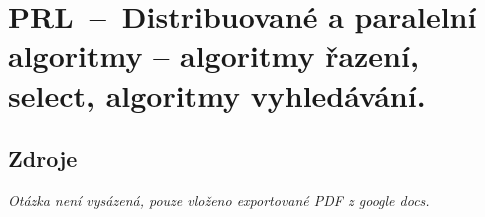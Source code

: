 

\graphicspath{{prl/paralelni_algoritmy_razeni_a_vyhledavani/figures}}


\chapter{PRL~--~Distribuované a paralelní algoritmy -- algoritmy řazení, select, algoritmy vyhledávání.}


\section{Zdroje}

\begin{compactitem}
    \item {}
    \item {}
    \item \textit{Otázka není vysázená, pouze vloženo exportované PDF z google docs.}
\end{compactitem}



